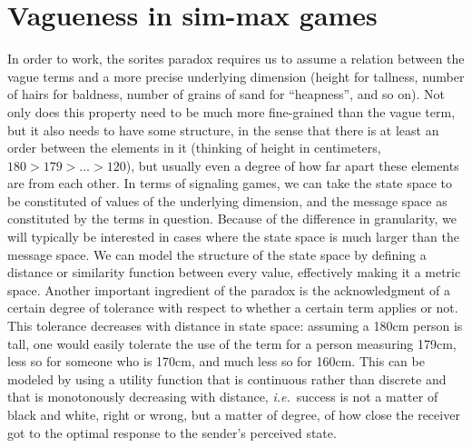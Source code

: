 \documentclass[a4paper]{article}
\begin{document}
%


\section{Vagueness in sim-max games}
\label{sec:sim-max-vagueness}

In order to work, the sorites paradox requires us to assume a relation between the vague terms and a more precise underlying dimension (height for tallness, number of hairs for baldness, number of grains of sand for ``heapness'', and so on).
Not only does this property need to be much more fine-grained than the vague term, but it also needs to have some structure, in the sense that there is at least an order between the elements in it (thinking of height in centimeters, $180 > 179 > \ldots > 120$), but usually even a degree of how far apart these elements are from each other.
In terms of signaling games, we can take the state space to be constituted of values of the underlying dimension, and the message space as constituted by the terms in question.
Because of the difference in granularity, we will typically be interested in cases where the state space is much larger than the message space.
We can model the structure of the state space by defining a distance or similarity function between every value, effectively making it a metric space.
Another important ingredient of the paradox is the acknowledgment of a certain degree of tolerance with respect to whether a certain term applies or not.
This tolerance decreases with distance in state space: assuming a 180cm person is tall, one would easily tolerate the use of the term for a person measuring 179cm, less so for someone who is 170cm, and much less so for 160cm.
This can be modeled by using a utility function that is continuous rather than discrete and that is monotonously decreasing with distance, \emph{i.e.}~success is not a matter of black and white, right or wrong, but a matter of degree, of how close the receiver got to the optimal response to the sender's perceived state.
\end{document}
